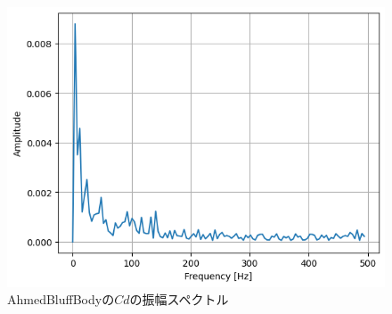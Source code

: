 \documentclass[main]{subfiles}
\begin{document}
\begin{figure}
    \centering
    \includegraphics[width=0.8\linewidth]{figures/ahmed/cd-fourier-amplitude.png}
    \caption{AhmedBluffBodyの$Cd$の振幅スペクトル}\label{fig:ahmed-cd-fft}
\end{figure}
\end{document}
